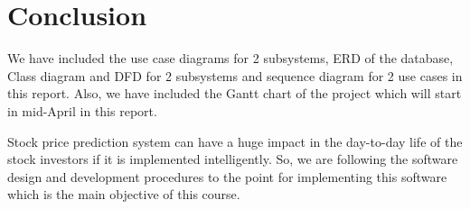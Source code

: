 \documentclass{article}[12pt]
\begin{document}
\section{Conclusion}
We have included the use case diagrams for 2 subsystems, ERD of the database, Class diagram and DFD for 2 subsystems and sequence diagram for 2 use cases in this report. Also, we have included the Gantt chart of the project which will start in mid-April in this report.

Stock price prediction system can have a huge impact in the day-to-day life of the stock investors if it is implemented intelligently. So, we are following the software design and development procedures to the point for implementing this software which is the main objective of this course. 
\end{document}
